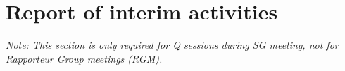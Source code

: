 \section{Report of interim activities}

\textit{Note: This section is only required for Q sessions during SG\studyGroup{} meeting, not for Rapporteur Group meetings (RGM).}



\interimReports
